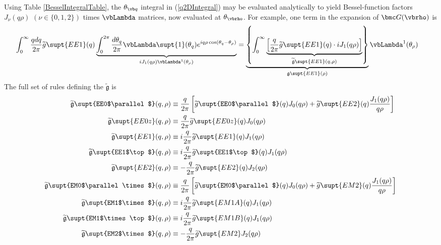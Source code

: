 \documentclass[letterpaper]{article}
\renewcommand{\wt}{\widetilde}
\begin{document}
Using Table \ref{BesselIntegralTable}, the $\theta_{\vb q}$ integral
in (\ref{q2DIntegral}) may be evaluated analytically to yield
Bessel-function factors $J_\nu(q\rho)$ $(\nu\in\{0,1,2\})$
times $\vbLambda$ matrices, now evaluated at $\theta_{\vbrho}$. For
example, one term in the expansion of $\bmc G(\vbrho)$ is
\begin{align*}
  \int_0^\infty \frac{q dq}{2\pi} \wt{g}\supt{EE1}(q)
  \underbrace{
  \int_0^{2\pi} \frac{d\theta_q}{2\pi}
                \vbLambda\supt{1}(\theta_q)e^{iq\rho\cos(\theta_q-\theta_\rho)}
             }_{iJ_1(q\rho)\vbLambda^1(\theta_\rho)}
&= \underbrace{
   \left\{\int_0^\infty 
   \underbrace{
   \left[\frac{q}{2\pi} \wt{g}\supt{EE1}(q)\cdot iJ_1(q\rho)\right]
              }_{\wt{\mathfrak g}\supt{EE1}(q,\rho)}
   \right\}}_{\mathfrak{g}\supt{EE1}(\rho)}
   \vbLambda^1(\theta_\rho)
\end{align*}
The full set of rules defining the $\wt{\mathfrak{g}}$ is
\begin{subequations}
\begin{align}
  \wt{\mathfrak{g}}\supt{EE0$\parallel$}(q,\rho)
&\equiv\frac{q}{2\pi}\left[    \wt{g}\supt{EE0$\parallel$}(q) J_0(q\rho)
                       +  \wt{g}\supt{EE2}(q) \frac{J_1(q\rho)}{q\rho}
               \right]
\\
  \wt{\mathfrak{g}}\supt{EE0z}(q,\rho)
&\equiv\frac{q}{2\pi}\wt{g}\supt{EE0z}(q) J_0(q\rho)
\\
  \wt{\mathfrak{g}}\supt{EE1}(q,\rho)
&\equiv i\frac{q}{2\pi}\wt{g}\supt{EE1}(q) J_1(q\rho)
\\
  \wt{\mathfrak{g}}\supt{EE1$\top$}(q,\rho)
&\equiv i\frac{q}{2\pi}\wt{g}\supt{EE1$\top$}(q) J_1(q\rho)
\\
  \wt{\mathfrak{g}}\supt{EE2}(q,\rho)
&\equiv-\frac{q}{2\pi}\wt{g}\supt{EE2}(q) J_2(q\rho)
\\
  \wt{\mathfrak{g}}\supt{EM0$\parallel \times$}(q,\rho)
&\equiv\frac{q}{2\pi}\left[    \wt{g}\supt{EM0$\parallel$}(q) J_0(q\rho)
                       +  \wt{g}\supt{EM2}(q) \frac{J_1(q\rho)}{q\rho}
                 \right]
\\
  \wt{\mathfrak{g}}\supt{EM1$\times$}(q,\rho)
&\equiv i\frac{q}{2\pi}\wt{g}\supt{EM1A}(q) J_1(q\rho)
\\
  \wt{\mathfrak{g}}\supt{EM1$\times\top$}(q,\rho)
&\equiv i\frac{q}{2\pi}\wt{g}\supt{EM1B}(q) J_1(q\rho)
\\
  \wt{\mathfrak{g}}\supt{EM2$\times$}(q,\rho)
&\equiv-\frac{q}{2\pi}\wt{g}\supt{EM2}J_2(q\rho)
\end{align}
\label{wtgFrakDef}%
\end{subequations}
\end{document}

